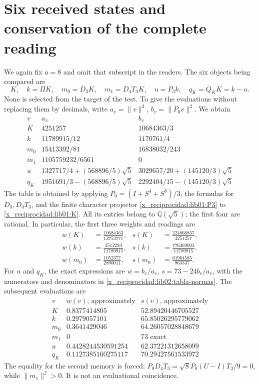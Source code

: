 \section{Six received states and conservation of the complete reading}
\label{x_reciprocidad:lib02:seis-estados}

We again fix \(a=8\) and omit that subscript in the readers. The six objects being compared are
\[
 K,\quad k=\Pi K,\quad m_0=D_3K,\quad m_1=D_4T_3K,
 \quad u=P_3k,\quad q_K=Q_KK=k-u.
\]
None is selected from the target of the test. To give the evaluations without replacing them by decimals, write \(a_v=\|v\|^2\), \(b_v=\|P_0v\|^2\). We obtain
\begin{equation}
\begin{array}{c|c|c}
 v&a_v&b_v\\\hline
 K&4251257&10684363/3\\
 k&11789915/12&1170761/4\\
 m_0&15413392/81&16838032/243\\
 m_1&1105759232/6561&0\\
 u&1327717/4+(568896/5)\sqrt5
   &3029657/20+(145120/3)\sqrt5\\
 q_K&1951691/3-(568896/5)\sqrt5
   &2292404/15-(145120/3)\sqrt5
\end{array}
 \label{x_reciprocidad:lib02:tabla-normas}
\end{equation}
The table is obtained by applying \(P_0=(I+S^4+S^8)/3\), the formulas for \(D_3,D_4T_3\), and the finite character projector \eqref{x_reciprocidad:lib01:P3} to \eqref{x_reciprocidad:lib01:K}. All its entries belong to \(\mathbb Q(\sqrt5)\); the first four are rational. In particular, the first three weights and readings are
\begin{align*}
 w(K)&=\frac{10684363}{12753771},&
 s(K)&=\frac{224866857}{4251257},\\
 w(k)&=\frac{3512283}{11789915},&
 s(k)&=\frac{776369003}{11789915},\\
 w(m_0)&=\frac{1052377}{2890011},&
 s(m_0)&=\frac{61904585}{963337}.
\end{align*}
For \(u\) and \(q_K\), the exact expressions are \(w=b_v/a_v\), \(s=73-24b_v/a_v\), with the numerators and denominators in \eqref{x_reciprocidad:lib02:tabla-normas}. The subsequent evaluations are
\[
\begin{array}{c|c|c}
 v&w(v)\text{, approximately}&s(v)\text{, approximately}\\\hline
 K&0.8377414805&52.89420446705527\\
 k&0.2979057101&65.85026295779062\\
 m_0&0.3641429046&64.26057028848679\\
 m_1&0&73\text{ exact}\\
 u&0.4428244530591254&62.37221312658099\\
 q_K&0.1127385160275117&70.29427561533972
\end{array}
\]
The equality for the second memory is forced: \(P_0D_4T_3=\sqrt8P_0(U-I)T_3/9=0\), while \(\|m_1\|^2>0\). It is not an evaluational coincidence.

